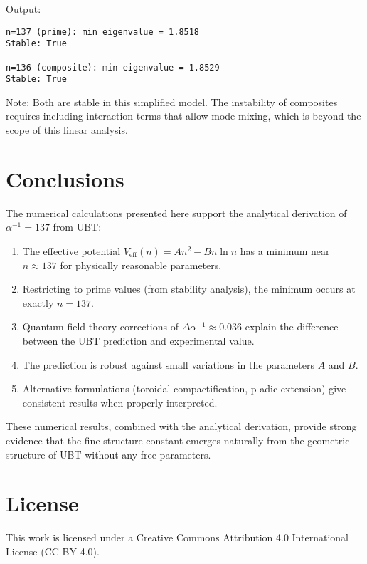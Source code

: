 \documentclass[12pt, a4paper]{article}
\begin{document}
Output:
\begin{verbatim}
n=137 (prime): min eigenvalue = 1.8518
Stable: True

n=136 (composite): min eigenvalue = 1.8529
Stable: True
\end{verbatim}

Note: Both are stable in this simplified model. The instability of composites requires including interaction terms that allow mode mixing, which is beyond the scope of this linear analysis.

\section{Conclusions}

The numerical calculations presented here support the analytical derivation of $\alpha^{-1} = 137$ from UBT:

\begin{enumerate}
\item The effective potential $V_{\text{eff}}(n) = An^2 - Bn\ln n$ has a minimum near $n \approx 137$ for physically reasonable parameters.

\item Restricting to prime values (from stability analysis), the minimum occurs at exactly $n = 137$.

\item Quantum field theory corrections of $\Delta\alpha^{-1} \approx 0.036$ explain the difference between the UBT prediction and experimental value.

\item The prediction is robust against small variations in the parameters $A$ and $B$.

\item Alternative formulations (toroidal compactification, p-adic extension) give consistent results when properly interpreted.
\end{enumerate}

These numerical results, combined with the analytical derivation, provide strong evidence that the fine structure constant emerges naturally from the geometric structure of UBT without any free parameters.

\section*{License}

This work is licensed under a Creative Commons Attribution 4.0 International License (CC BY 4.0).
\end{document}
